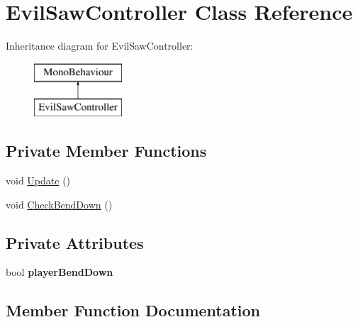 \hypertarget{class_evil_saw_controller}{}\section{Evil\+Saw\+Controller Class Reference}
\label{class_evil_saw_controller}
Inheritance diagram for Evil\+Saw\+Controller\+:\begin{figure}[H]
\begin{center}
\leavevmode
\includegraphics[height=2.000000cm]{class_evil_saw_controller}
\end{center}
\end{figure}
\subsection*{Private Member Functions}
\begin{DoxyCompactItemize}
\item 
void \mbox{\hyperlink{class_evil_saw_controller_ace55f9277b7c17f583ec0fe8b2f674a3}{Update}} ()
\item 
void \mbox{\hyperlink{class_evil_saw_controller_ad1e4264c7e2eeb0d7dc879074ec9a7ca}{Check\+Bend\+Down}} ()
\end{DoxyCompactItemize}
\subsection*{Private Attributes}
\begin{DoxyCompactItemize}
\item 
\mbox{\label{class_evil_saw_controller_aa5d9c665d8ab70b7b4d04463774b38d0}} 
bool {\bfseries player\+Bend\+Down}
\end{DoxyCompactItemize}


\subsection{Member Function Documentation}
\mbox{\label{class_evil_saw_controller_ad1e4264c7e2eeb0d7dc879074ec9a7ca}} 
